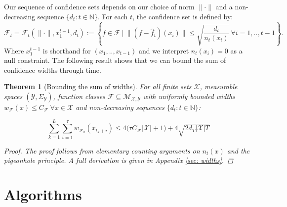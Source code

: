 \documentclass{article}
\newtheorem{theorem}{Theorem}
\newcommand{\Nat}{\mathbb{N}}
\newcommand{\Xc}{\mathcal{X}}
\newcommand{\Yc}{\mathcal{Y}}
\newcommand{\Fc}{\mathcal{F}}
\newcommand{\Mc}{\mathcal{M}}
\begin{document}
Our sequence of confidence sets depends on our choice of norm $\| \cdot \|$ and a non-decreasing sequence $\{d_t : t \in \Nat\}$.
For each $t$, the confidence set is defined by:
$$\Fc_t = \Fc_t ( \| \cdot \|, x^{t-1}_1 , d_t):= \left\{f \in \Fc \ \bigg\vert \ \|(f - \hat{f}_t)(x_i)\| \leq \sqrt{\frac{d_t}{n_t(x_i)}} \ \forall i=1,..,t-1 \right\}.$$
Where $x^{t-1}_1$ is shorthand for $(x_1, .. ,x_{t-1})$ and we interpret $n_t(x_i) = 0$ as a null constraint.
The following result shows that we can bound the sum of confidence widths through time.


\begin{theorem}[Bounding the sum of widths] 
\label{thm: widths} \hspace{0.000000001mm} \newline
For all finite sets $\Xc$, measurable spaces $(\Yc,\Sigma_{\Yc})$, function classes $\Fc \subseteq \Mc_{\Xc,\Yc}$ with uniformly bounded widths $w_\Fc(x) \le C_\Fc \ \forall x \in \Xc$ and non-decreasing sequences $\{d_t : t \in \Nat \}$:

\begin{equation}
	\sum_{k=1}^L \sum_{i=1}^\tau w_{\mathcal{F}_{k}}(x_{t_k+i}) 
	\le  4 \big(\tau C_\Fc | \Xc | + 1\big) + 4 \sqrt{2d_T | \Xc | T}
\end{equation}

\begin{proof}
The proof follows from elementary counting arguments on $n_t(x)$ and the pigeonhole principle.
A full derivation is given in Appendix \ref{sec: widths}.
\end{proof}
\end{theorem}




\section{Algorithms}
\label{sec: algos}
\end{document}
